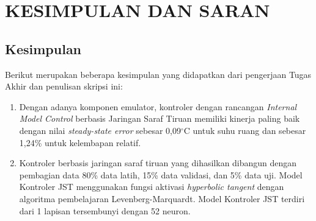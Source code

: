 \chapter{KESIMPULAN DAN SARAN}
\label{kesimpulan-dan-saran}



\section{Kesimpulan}

Berikut merupakan beberapa kesimpulan yang didapatkan dari pengerjaan Tugas Akhir dan penulisan skripsi ini:
\begin{enumerate}
	\item  Dengan adanya komponen emulator, kontroler dengan rancangan \textit{Internal Model Control} berbasis Jaringan Saraf Tiruan memiliki kinerja paling baik dengan nilai \textit{steady-state error} sebesar 0,09$^\circ$C untuk suhu ruang dan sebesar 1,24\% untuk kelembapan relatif.
	\item Kontroler berbasis jaringan saraf tiruan yang dihasilkan dibangun dengan pembagian data 80\% data latih, 15\% data validasi, dan 5\% data uji. Model Kontroler JST menggunakan fungsi aktivasi \textit{hyperbolic tangent} dengan algoritma pembelajaran Levenberg-Marquardt. Model Kontroler JST terdiri dari 1 lapisan tersembunyi dengan 52 neuron.
\end{enumerate}

 


